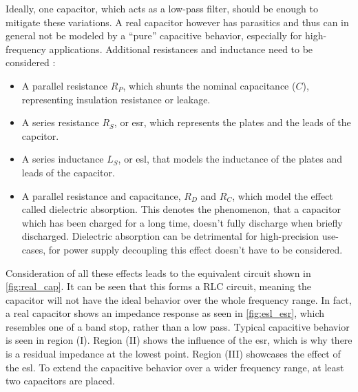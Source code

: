 Ideally, one capacitor, which acts as a low-pass filter, should be enough to mitigate these variations.
A real capacitor however has parasitics and thus can in general not be modeled by a ``pure'' capacitive behavior, especially for high-frequency applications. %
Additional resistances and inductance need to be considered \cite{decouple}:
\begin{itemize}
	\item A parallel resistance $R_P$, which shunts the nominal capacitance ($C$), representing insulation resistance or leakage.
	\item A series resistance $R_S$, or \gls{esr}, which represents the plates and the leads of the capcitor.
	\item A series inductance $L_S$, or \gls{esl}, that models the inductance of the plates and leads of the capacitor.
	\item A parallel resistance and capacitance, $R_D$ and $R_C$, which model the effect called dielectric absorption. This denotes the phenomenon, that a capacitor which has been charged for a long time, doesn't fully discharge when briefly discharged. Dielectric absorption can be detrimental for high-precision use-cases, for power supply decoupling this effect doesn't have to be considered.
\end{itemize}
Consideration of all these effects leads to the equivalent circuit shown in \autoref{fig:real_cap}.
It can be seen that this forms a RLC circuit, meaning the capacitor will not have the ideal behavior over the whole frequency range. 
In fact, a real capacitor shows an impedance response as seen in \autoref{fig:esl_esr}, which resembles one of a band stop, rather than a low pass.
Typical capacitive behavior is seen in region (I).
Region (II) shows the influence of the \gls{esr}, which is why there is a residual impedance at the lowest point.
Region (III) showcases the effect of the \gls{esl}. 
To extend the capacitive behavior over a wider frequency range, at least two capacitors are placed.

